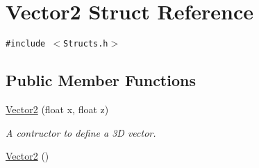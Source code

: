 \hypertarget{struct_vector2}{
\section{Vector2 Struct Reference}
\label{struct_vector2}
}
{\tt \#include $<$Structs.h$>$}

\subsection*{Public Member Functions}
\begin{CompactItemize}
\item 
\hyperlink{struct_vector2_24d2d059ca7d66113abac07ef1854b57}{Vector2} (float x, float z)
\begin{CompactList}\small\item\em A contructor to define a 3D vector. \item\end{CompactList}\item 
\hypertarget{struct_vector2_22104d1809be26a419ef1f959e3761bf}{
\hyperlink{struct_vector2_22104d1809be26a419ef1f959e3761bf}{Vector2} ()}
\label{struct_vector2_22104d1809be26a419ef1f959e3761bf}


\end{CompactItemize}
